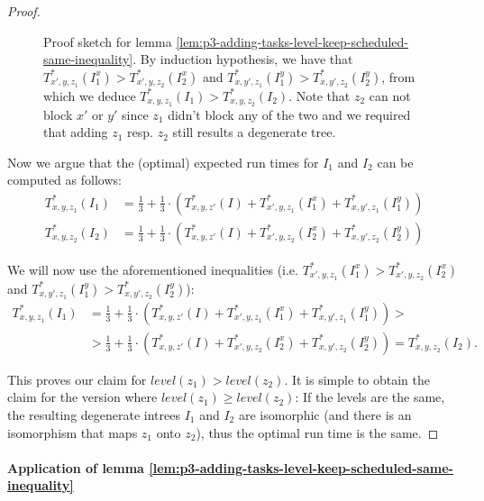 \begin{proof}
\begin{figure}[t]
    \caption{Proof sketch for lemma \ref{lem:p3-adding-tasks-level-keep-scheduled-same-inequality}. By induction hypothesis, we have that $T^*_{x',y,z_1}(I^x_{1}) > T^*_{x',y,z_2}(I^x_{2})$ and $T^*_{x,y',z_1}(I^y_{1}) > T^*_{x,y',z_2}(I^y_{2})$, from which we deduce $T^*_{x,y,z_1}(I_1) > T^*_{x,y,z_2}(I_2)$. Note that $z_2$ can not block $x'$ or $y'$ since $z_1$ didn't block any of the two and we required that adding $z_1$ resp. $z_2$ still results a degenerate tree.}
    \label{fig:p3-adding-tasks-level-keep-scheduled-same-inequality}
  \end{figure}
  
  Now we argue that the (optimal) expected run times for $I_1$ and $I_2$ can be computed as follows:
  \begin{align*}
    T^*_{x,y,z_1}(I_1) & = 
      \frac{1}{3} + 
      \frac{1}{3}\cdot \left( 
        T_{x,y,z'}^*(I) + 
        T^*_{x',y,z_1}(I^x_{1}) +
        T^*_{x,y',z_1}(I^y_{1}) 
      \right)
      \\
    T^*_{x,y,z_2}(I_2) & = 
      \frac{1}{3} + 
      \frac{1}{3}\cdot \left( 
        T_{x,y,z'}^*(I) + 
        T^*_{x',y,z_2}(I^x_{2}) +
        T^*_{x,y',z_2}(I^y_{2}) 
      \right)
  \end{align*}

  We will now use the aforementioned inequalities (i.e. $T^*_{x',y,z_1}(I^x_{1}) > T^*_{x',y,z_2}(I^x_{2})$ and $T^*_{x,y',z_1}(I^y_{1}) > T^*_{x,y',z_2}(I^y_{2})$):
\begin{align*}
    T^*_{x,y,z_1}(I_1) & = 
      \frac{1}{3} + 
      \frac{1}{3}\cdot \left( 
        T_{x,y,z'}^*(I) + 
        T^*_{x',y,z_1}(I^x_{1}) +
        T^*_{x,y',z_1}(I^y_{1}) 
      \right)
      > 
      \\
      & >
      \frac{1}{3} + 
      \frac{1}{3}\cdot \left( 
        T_{x,y,z'}^*(I) + 
        T^*_{x',y,z_2}(I^x_{2}) +
        T^*_{x,y',z_2}(I^y_{2}) 
      \right) 
      = T^*_{x,y,z_2}(I_2).
  \end{align*}

  This proves our claim for $level(z_1) > level(z_2)$. It is simple to obtain the claim for the version where $level(z_1) \geq level(z_2)$: If the levels are the same, the resulting degenerate intrees $I_1$ and $I_2$ are isomorphic (and there is an isomorphism that maps $z_1$ onto $z_2$), thus the optimal run time is the same. 
\end{proof}

\paragraph{Application of lemma \ref{lem:p3-adding-tasks-level-keep-scheduled-same-inequality}}

